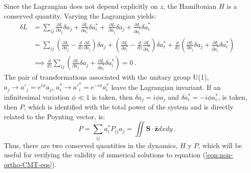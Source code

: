 Since the Lagrangian does not depend explicitly on $z$, the Hamiltonian $H$ is a conserved quantity. Varying the Lagrangian yields:
\begin{align*}
	\delta L &= \sum_{ij} \frac{\partial L}{\partial a_j} \delta a_{j} +  \frac{\partial L}{\partial {a}_{i}^*} \delta {a}_{i}^* + \ \frac{\partial L}{\partial \dot{a}_{j}} \delta \dot{a}_{j} + \frac{\partial L}{\partial \dot{{a}}_{i}^*} \delta \dot{{a}}_{i}^*
	\\
	&= \sum_{ij} \left( \frac{\partial L}{\partial a_{j}} - \frac{d}{dz}\frac{\partial L}{\partial \dot{a}_{j}} \right)\delta a_{j} + \left( \frac{\partial L}{\partial {a}_{i}^*} - \frac{d}{dz}\frac{\partial L}{\partial  \dot{{a}}_{i}^*} \right)\delta {a}_{i}^* + \frac{d}{dz}\left(\frac{\partial L}{\partial \dot{a}_{j}}\delta a_{j} +  \frac{\partial L}{\partial \dot{{a}}^*_{i}}\delta {a}_{i}^*\right)
	\\	
	&\implies  \frac{d}{dz} \sum_{ij}\left(\frac{\partial L}{\partial \dot{a}_{j}}\delta a_{j} +  \frac{\partial L}{\partial \dot{{a}}_{i}^*}\delta {a}_{i}^*\right) = 0 \ .
\end{align*}
The pair of transformations associated with the unitary group U(1), $a_j\to a'_j = e^{i\phi}a_j$, ${a}_i^* \to {a'}_i^* = e^{-i\phi}{a}_i^*$ leave the Lagrangian invariant. If an infinitesimal variation $\phi \ll 1$ is taken, then $\delta a_j = i\phi a_j$ and $\delta {a}_i^* = -i\phi {a}_i^*$, is taken, then $P$, which is identified with the total power of the system and is directly related to the Poynting vector, is:
\begin{equation}
	P = \sum_{ij} a_i^* P_{ij} a_j = \iint \textbf{S} \cdot \hat{\textbf{z}} dxdy \ .  \label{eqn:power}
\end{equation}
Thus, there are two conserved quantities in the dynamics, $H$ y $P$, which will be useful for verifying the validity of numerical solutions to equation (\ref{eqn:non-ortho-CMT-eqs}).

